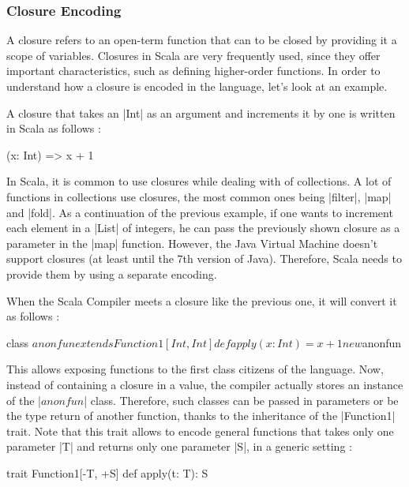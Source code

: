 \subsubsection{Closure Encoding}

A closure refers to an open-term function that can to be closed by providing it a scope of variables. Closures in Scala are very frequently used, since they offer important characteristics, such as defining higher-order functions. In order to understand how a closure is encoded in the language, let's look at an example.

A closure that takes an |Int| as an argument and increments it by one is written in Scala as follows :

\begin{lstlisting-nobreak}
 (x: Int) => x + 1
\end{lstlisting-nobreak}

In Scala, it is common to use closures while dealing with of collections. A lot of functions in collections use closures, the most common ones being |filter|, |map| and |fold|. As a continuation of the previous example, if one wants to increment each element in a |List| of integers, he can pass the previously shown closure as a parameter in the |map| function. However, the Java Virtual Machine doesn't support closures (at least until the 7th version of Java). Therefore, Scala needs to provide them by using a separate encoding.

When the Scala Compiler meets a closure like the previous one, it will convert it as follows :

\begin{lstlisting-nobreak}
 {
  class $anonfun extends Function1[Int, Int] {
    def apply(x: Int) = x + 1
  }

  new $anonfun
 }
\end{lstlisting-nobreak}

This allows exposing functions to the first class citizens of the language. Now, instead of containing a closure in a value, the compiler actually stores an instance of the |$anonfun$| class. Therefore, such classes can be passed in parameters or be the type return of another function, thanks to the inheritance of the |Function1| trait. Note that this trait allows to encode general functions that takes only one parameter |T| and returns only one parameter |S|, in a generic setting :

\begin{lstlisting-nobreak}
 trait Function1[-T, +S] {
   def apply(t: T): S
 }
\end{lstlisting-nobreak}

